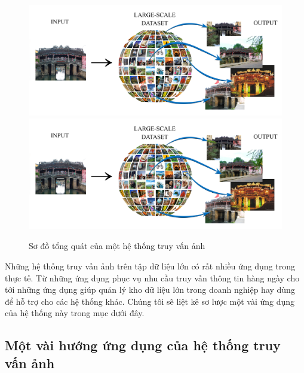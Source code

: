\begin{figure}[!htbp]
  \begin{center}
    \leavevmode
    \ifpdf
      \includegraphics[scale=0.113]{retrievalSystem}
    \else
      \includegraphics[scale=0.113]{retrievalSystem}
    \fi
    \caption[Sơ đồ tổng quát của một hệ thống truy vấn ảnh]{Sơ đồ tổng quát của một hệ thống truy vấn ảnh}
    \label{FigSystem}
  \end{center}
\end{figure} 

Những hệ thống truy vấn ảnh trên tập dữ liệu lớn có rất nhiều ứng dụng trong thực tế. Từ những ứng dụng phục vụ nhu cầu truy vấn thông tin hàng ngày cho tới những ứng dụng giúp quản lý kho dữ liệu lớn trong doanh nghiệp hay dùng để hỗ trợ cho các hệ thống khác. Chúng tôi sẽ liệt kê sơ lược một vài ứng dụng của hệ thống này trong mục dưới đây.

\subsection{Một vài hướng ứng dụng của hệ thống truy vấn ảnh}

